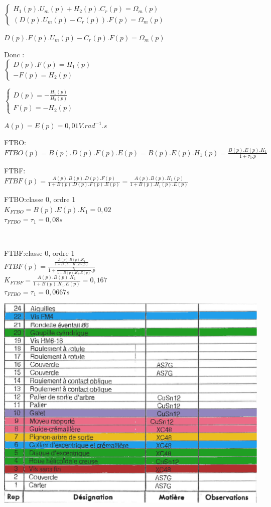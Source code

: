 
$\left\{\begin{array}{l}
H_1(p).U_m(p)+H_2(p).C_r(p)=\Omega_m(p)\\
(D(p).U_m(p)-C_r(p)).F(p)=\Omega_m(p)
\end{array}\right.$

$D(p).F(p).U_m(p)-C_r(p).F(p)=\Omega_m(p)$

Donc :\\
$\left\{\begin{array}{l}
D(p).F(p)=H_1(p) \\
-F(p)=H_2(p)
\end{array}\right.$

$\left\{\begin{array}{l}
D(p)=-\frac{H_1(p)}{H_2(p)} \\
F(p)=-H_2(p)
\end{array}\right.$


$A(p)=E(p)=0,01V.rad^{-1}.s$


FTBO:\\
$FTBO(p)=B(p).D(p).F(p).E(p)=B(p).E(p).H_1(p)=\frac{B(p).E(p).K_1}{1+\tau_1.p}$

FTBF:\\
$FTBF(p)=\frac{A(p).B(p).D(p).F(p)}{1+B(p).D(p).F(p).E(p)}=\frac{A(p).B(p).H_1(p)}{1+B(p).H_1(p).E(p)}$


FTBO:classe 0, ordre 1\\
$K_{FTBO}=B(p).E(p).K_1=0,02$\\
$\tau_{FTBO}=\tau_1=0,08s$

~\

FTBF:classe 0, ordre 1\\
$FTBF(p)=\frac{\frac{A(p).B(p).K_1}{1+B(p).K_1.E(p)}}{1+\frac{\tau_1}{1+B(p).K_1.E(p)}.p}$\\
$K_{FTBF}=\frac{A(p).B(p).K_1}{1+B(p).K_1.E(p)}=0,167$\\
$\tau_{FTBO}=\tau_1=0,0667s$

\begin{center}
 \centering\includegraphics[width=0.7\linewidth]{img/Commande_essui_glace_nom_cor.pdf}
\end{center}





